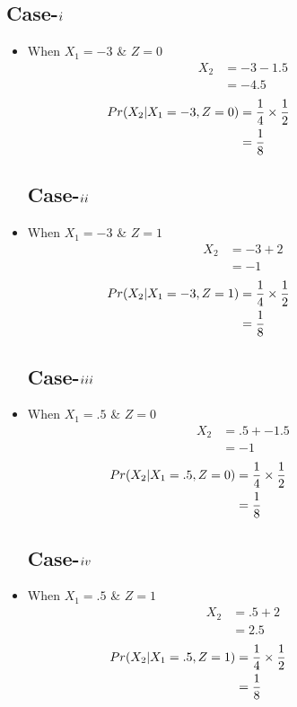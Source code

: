 \documentclass[11pt,a4paper,twocolumn]{article}
\begin{document}
        \subsection{Case-$\romannumeral1$}
\begin{itemize}
    \item When $X_{1}=-3$ \& $Z=0$
    \begin{align*}
        X_{2}&=-3-1.5\\
        &=-4.5
    \end{align*}
    \begin{align*}
    \hspace{-2.5cm}
        Pr(X_{2}|X_{1}=-3,Z=0)&=\frac{1}{4}\times\frac{1}{2}\\
        &=\frac{1}{8}
    \end{align*}
        \subsection{Case-$\romannumeral2$}
      \item When $X_{1}=-3$ \& $Z=1$
    \begin{align*}
        X_{2}&=-3+2\\
        &=-1
    \end{align*}
    \begin{align*}
    \hspace{-2.5cm}
        Pr(X_{2}|X_{1}=-3,Z=1)&=\frac{1}{4}\times\frac{1}{2}\\
        &=\frac{1}{8}
    \end{align*}
        \subsection{Case-$\romannumeral3$}
      \item When $X_{1}=.5$ \& $Z=0$
    \begin{align*}
        X_{2}&=.5+-1.5\\
        &=-1
    \end{align*}
    \begin{align*}
    \hspace{-2.5cm}
        Pr(X_{2}|X_{1}=.5,Z=0)&=\frac{1}{4}\times\frac{1}{2}\\
        &=\frac{1}{8}
    \end{align*}
        \subsection{Case-$\romannumeral4$}
   \item When $X_{1}=.5$ \& $Z=1$
    \begin{align*}
        X_{2}&=.5+2\\
        &=2.5
    \end{align*}
    \begin{align*}
    \hspace{-2.5cm}
        Pr(X_{2}|X_{1}=.5,Z=1)&=\frac{1}{4}\times\frac{1}{2}\\
        &=\frac{1}{8}
    \end{align*}

\end{itemize}
\end{document}
